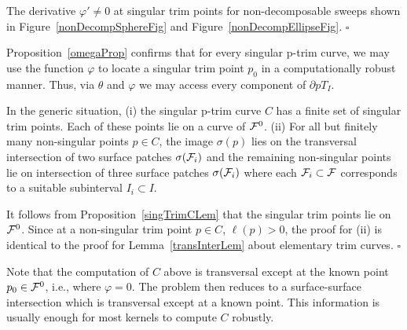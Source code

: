 \documentclass{elsart5p}
\newcommand{\eat}[1]{}
\begin{document}
The derivative $\varphi' \neq 0$ at singular trim points for non-decomposable sweeps shown in 
Figure~\ref{nonDecompSphereFig} and Figure~\ref{nonDecompEllipseFig}.
\hfill $\square$

\eat{
\begin{figure}
 \centering
 \texttt{[image: plot]}
 \caption{The plot of the function $\varphi$ for the sweep example shown in 
Figure~\ref{nonDecompSphereFig}.}
 \label{varphiPlotFig}
\end{figure}
}

Proposition~\ref{omegaProp} confirms that for every singular p-trim curve, we may use the 
function $\varphi$ to locate a singular trim point $p_0$ in a computationally robust manner.  Thus, 
via $\theta$ and $\varphi$ we may access every component of $\partial pT_I$.

\begin{prop}
In the generic situation, (i) the singular p-trim curve $C$ has a finite set of singular trim points.  Each of these 
points lie on a curve of ${\cal F}^0$. (ii) For all but finitely many non-singular points $p \in C$, the image 
$\sigma(p)$ lies on the transversal intersection of two surface patches $\sigma({\cal F}_i)$ 
and the remaining non-singular points lie on intersection of three surface patches $\sigma({\cal F}_i)$
where each ${\cal F}_i \subset {\cal F}$ corresponds to a suitable 
subinterval $I_i \subset I$. 
\end{prop}
It follows from Proposition~\ref{singTrimCLem} that the singular trim points lie on ${\cal F}^0$. Since at a 
non-singular trim point $p \in C$, $\ell(p) > 0$, the proof for (ii) is identical to the proof for Lemma~\ref{transInterLem} about elementary trim curves.
\hfill $\square$

Note that the computation of $C$ above is transversal except at the known point $p_0 
\in {\cal F}^0$, i.e., where $\varphi=0$. The problem then reduces to a surface-surface intersection which is transversal except at a known point. This information is usually enough for most kernels to compute $C$ robustly.

\eat{
We now describe the tracing of a singular p-trim curve $C$ once a point $p_0$ in ${\cal F}^0$ has been located 
where $\varphi$ is zero.  
Since ${\cal F}^0$ and $C$ meet tangentially at $p_0$, starting 
at $p_0$ we take small steps in direction $\frac{d \Omega}{ds}|_{p_0}$ and $-\frac{d \Omega}{ds}|_{p_0}$ 
to obtain points $\tilde{p}_1$ and $\tilde{p}'_1$ respectively which are fed to a Newton-Raphson solver which 
returns points $p_1$ and $p'_1$ such that $p_1, p'_1 \in {\cal F}$, $\sigma(p_1) = \sigma(p'_1)$ and 
$t(p_1) - t(p'_1) = t(\tilde{p}_1) - t(\tilde{p}'_1)$.  Let $q_1 := \sigma(p_1) = \sigma(p'_1)$.  
Here, $t(p)$ denotes the $t$-coordinate of $p$.
The point $q_1$ is on the trim curve and the points $p_1$ and $p'_1$ are on the p-trim curve $C$. 
Since points $p_1$ and $p'_1$ are non-singular, these can be fed as starting points to any of the known 
surface-surface intersection algorithms to compute the trim curve. 
}
\end{document}
